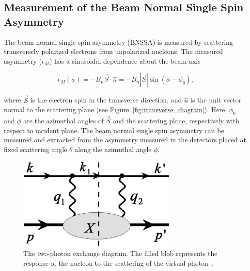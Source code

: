 \subsection{Measurement of the Beam Normal Single Spin Asymmetry}
\label{Measurement of the Beam Normal Single Spin Asymmetry}

The beam normal single spin asymmetry (BNSSA) is measured by scattering transversely polarized electrons from unpolarized nucleons. The measured asymmetry ($\epsilon_{M}$) has a sinusoidal dependence about the beam axis 

\begin{equation} \label{equ:transverse1}
\epsilon_{M} (\phi) = - B_{n} \vec{S} \cdot \hat{n} = - B_{n} |\vec{S}| \sin (\phi-\phi_{0}),
\end{equation}

\noindent
where $\vec{S}$ is the electron spin in the transverse direction, and $\hat{n}$ is the unit vector normal to the scattering plane (see Figure~\ref{fig:transverse_diagram}). Here, $\phi_{0}$ and $\phi$ are the azimuthal angles of $\vec{S}$ and the scattering plane, respectively with respect to incident plane. 
The beam normal single spin asymmetry can be measured and extracted from the asymmetry measured in the detectors placed at fixed scattering angle $\theta$ along the azimuthal angle $\phi$.



\begin{singlespace}
\begin{figure}[!h]
	\begin{center}
	\includegraphics[width=8.0cm]{figures/FeynmanDiagrams_ep}
	\end{center}
	\caption
	{The two-photon exchange diagram. The filled blob represents the response of the nucleon to the scattering of the virtual photon~\cite{PhysRevC.70.045206, Pasquini2005}.}
	\label{fig:FeynmanDiagrams_ep}
\end{figure}
\end{singlespace}


